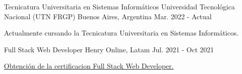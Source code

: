 

\begin{cventries}

  \cventry
    {Tecnicatura Universitaria en Sistemas Informáticos} %
    {Universidad Tecnológica Nacional (UTN FRGP)} %
    {Buenos Aires, Argentina} %
    {Mar. 2022 - Actual} %
    {
      \begin{cvitems} %
        \item {Actualmente cursando la Tecnicatura Universitaria en Sistemas Informáticos.}
      \end{cvitems}
    }

  \cventry
    {Full Stack Web Developer} %
    {Henry} %
    {Online, Latam} %
    {Jul. 2021 - Oct 2021} %
    {
      \begin{cvitems} %
        \item {\href{https://certificates.soyhenry.com/cert?id=970c6032-7d99-4536-90b3-e421ec1036d5}{Obtención de la certificacion Full Stack Web Developer.}}
      \end{cvitems}
    }

\end{cventries}
